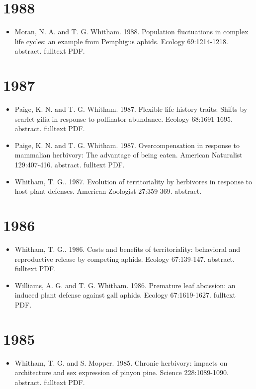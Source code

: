 \documentclass[12pt]{article}
\begin{document}
\section{1988}
\begin{itemize}
\item Moran, N. A. and T. G. Whitham. 1988. Population fluctuations in
complex life cycles: an example from Pemphigus aphids. Ecology
69:1214-1218. abstract. fulltext PDF.
 
\end{itemize}

\section{1987}
\begin{itemize}
\item Paige, K. N. and T. G. Whitham. 1987. Flexible life history traits:
Shifts by scarlet gilia in response to pollinator abundance. Ecology
68:1691-1695. abstract. fulltext PDF.

\item Paige, K. N. and T. G. Whitham. 1987. Overcompensation in response to
mammalian herbivory: The advantage of being eaten. American Naturalist
129:407-416. abstract. fulltext PDF. 

\item Whitham, T. G.. 1987. Evolution of territoriality by herbivores in
response to host plant defenses. American Zoologist 27:359-369. abstract.
\end{itemize}

\section{1986}
\begin{itemize}
\item Whitham, T. G.. 1986. Costs and benefits of territoriality: behavioral
and reproductive release by competing aphids. Ecology
67:139-147. abstract. fulltext PDF.
 
\item Williams, A. G. and T. G. Whitham. 1986. Premature leaf abcission: an
induced plant defense against gall aphids. Ecology
67:1619-1627. fulltext PDF.
 
\end{itemize}

\section{1985}
\begin{itemize}
\item Whitham, T. G. and S. Mopper. 1985. Chronic herbivory: impacts on
architecture and sex expression of pinyon pine. Science
228:1089-1090. abstract. fulltext PDF.
\end{itemize}
\end{document}
